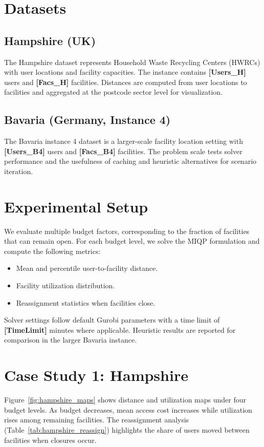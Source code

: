 \documentclass[11pt]{article}
\begin{document}
\section{Datasets}
\subsection{Hampshire (UK)}
The Hampshire dataset represents Household Waste Recycling Centers (HWRCs) with user locations and facility capacities. The instance contains \textbf{[Users\_H]} users and \textbf{[Facs\_H]} facilities. Distances are computed from user locations to facilities and aggregated at the postcode sector level for visualization.

\subsection{Bavaria (Germany, Instance 4)}
The Bavaria instance 4 dataset is a larger-scale facility location setting with \textbf{[Users\_B4]} users and \textbf{[Facs\_B4]} facilities. The problem scale tests solver performance and the usefulness of caching and heuristic alternatives for scenario iteration.

\section{Experimental Setup}
We evaluate multiple budget factors, corresponding to the fraction of facilities that can remain open. For each budget level, we solve the MIQP formulation and compute the following metrics:
\begin{itemize}[leftmargin=*]
\item Mean and percentile user-to-facility distance.
\item Facility utilization distribution.
\item Reassignment statistics when facilities close.
\end{itemize}
Solver settings follow default Gurobi parameters with a time limit of \textbf{[TimeLimit]} minutes where applicable. Heuristic results are reported for comparison in the larger Bavaria instance.

\section{Case Study 1: Hampshire}
Figure~\ref{fig:hampshire_maps} shows distance and utilization maps under four budget levels. As budget decreases, mean access cost increases while utilization rises among remaining facilities. The reassignment analysis (Table~\ref{tab:hampshire_reassign}) highlights the share of users moved between facilities when closures occur.
\end{document}
